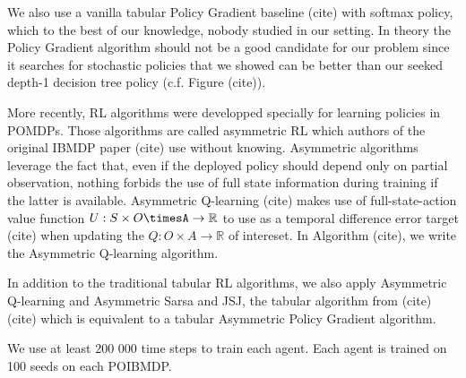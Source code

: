 We also use a vanilla tabular Policy Gradient baseline (cite) with softmax policy, which to the best of our knowledge, nobody studied in our setting.
In theory the Policy Gradient algorithm should not be a good candidate for our problem since it searches for stochastic policies that we showed can be better than our seeked depth-1 decision tree policy (c.f. Figure (cite)).

More recently, RL algorithms were developped specially for learning policies in POMDPs. Those algorithms are called asymmetric RL which authors of the original IBMDP paper (cite) use without knowing. 
Asymmetric algorithms leverage the fact that, even if the deployed policy should depend only on partial observation, nothing forbids the use of full state information during training if the latter is available.
Asymmetric Q-learning (cite) makes use of full-state-action value function $U:S\times O \timesA \rightarrow \mathbb{R}$ to use as a temporal difference error target (cite) when updating the $Q:O\times A\rightarrow \mathbb{R}$ of intereset. 
In Algorithm (cite), we write the Asymmetric Q-learning algorithm.    

In addition to the traditional tabular RL algorithms, we also apply Asymmetric Q-learning and Asymmetric Sarsa and JSJ, the tabular algorithm from (cite)(cite) which is equivalent to a tabular Asymmetric Policy Gradient algorithm.

We use at least 200 000 time steps to train each agent. Each agent is trained on 100 seeds on each POIBMDP.  

